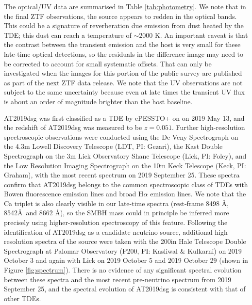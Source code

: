 \documentclass{nature_plusfigure}
\begin{document}
\begin{methods}
The optical/UV data are summarised in Table \ref{tab:photometry}. We note that in the final ZTF observations, the source appears to redden in the optical bands. This could be a signature of reverberation due emission from dust heated by the TDE\cite{2016ApJ...829...19V,2016MNRAS.458..575L}; this dust can reach a temperature of $\sim 2000$ K. An important caveat is that the contrast between the transient emission and the host is very small for these late-time optical detections, so the residuals in the difference image may need to be corrected to account for small systematic offsets. That can only be investigated when the images for this portion of the public survey are published as part of the next ZTF data release. We note that the UV observations are not subject to the same uncertainty because even at late times the transient UV flux is about an order of magnitude brighter than the host baseline.

AT2019dsg was first classified as a TDE by ePESSTO+ on on 2019 May 13\cite{2019ATel12752....1N}, and the redshift of AT2019dsg was measured to be $z=0.051$. Further high-resolution spectroscopic observations were conducted using the De Veny Spectrograph on the 4.3m Lowell Discovery Telescope (LDT, PI: Gezari), the Kast Double Spectrograph on the 3m Lick Observatory Shane Telescope (Lick, PI: Foley)\cite{Miller93}, and the Low Resolution Imaging Spectrograph on the 10m Keck Telescope (Keck, PI: Graham)\cite{Oke95}, with the most recent spectrum on 2019 September 25. These spectra confirm that AT2019dsg belongs to the common spectroscopic class of TDEs with Bowen fluorescence emission lines and broad H$\alpha$ emission lines\cite{2020arXiv200101409V}. We note that the Ca triplet is also clearly visible in our late-time spectra (rest-frame 8498 \AA, 8542\AA ~and 8662 \AA), so the SMBH mass could in principle be inferred more precisely using higher-resolution spectroscopy of this feature\cite{2005MNRAS.359..765G}. Following the identification of AT2019dsg as a candidate neutrino source, additional high-resolution spectra of the source were taken with the 200in Hale Telescope Double Spectrograph at Palomar Observatory (P200, PI: Kasliwal \& Kulkarni) on 2019 October 3 and again with  Lick on 2019 October 5 and 2019 October 29 (shown in Figure \ref{fig:spectrum}). There is no evidence of any significant spectral evolution between these spectra and the most recent pre-neutrino spectrum from 2019 September 25, and the spectral evolution of AT2019dsg is consistent with that of other TDEs\cite{2020arXiv200101409V}. 


\end{methods}
\end{document}
